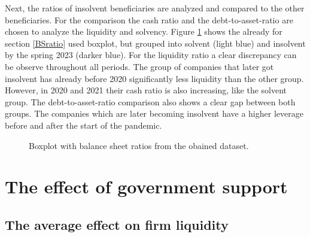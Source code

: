 Next, the ratios of insolvent beneficiaries are analyzed and compared to the other beneficiaries. For the comparison the cash ratio and the debt-to-asset-ratio are chosen to analyze the liquidity and solvency. Figure \ref{fig:RatiosInsolvency} shows the already for section \ref{BSratio} used boxplot, but grouped into solvent (light blue) and insolvent by the spring 2023 (darker blue). For the liquidity ratio a clear discrepancy can be observe throughout all periods. The group of companies that later got insolvent has already before 2020 significantly less liquidity than the other group. However, in 2020 and 2021 their cash ratio is also increasing, like the solvent group.
The debt-to-asset-ratio comparison also shows a clear gap between both groups. The companies which are later becoming insolvent have a higher leverage before and after the start of the pandemic. 

\begin{figure}
    \centering
    
    \decoRule
    \caption[Liquidity and solvency of insolvent beneficiaries]{Boxplot with balance sheet ratios from the obained dataset.}
    \label{fig:RatiosInsolvency}
\end{figure}






\section{The effect of government support}



\subsection{The average effect on firm liquidity}




